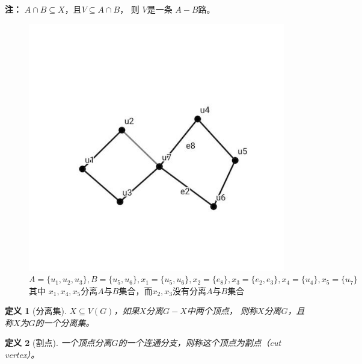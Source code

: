 \documentclass[UTF8]{ctexart}
\newtheorem{mydef}{定义}
\begin{document}
    \textbf{注：}
    $A \cap B \subseteq  X$，且$ V \subseteq A \cap B  $，
    则 $V$是一条 $A-B$路。
    
    
     \begin{figure}[ht]
        \centering
        \includegraphics[scale=0.3]{tu1.png}
        \caption{$A= \lbrace u_{1},u_{2},u_{3} \rbrace, B= \lbrace u_{5},u_{6}\rbrace ,x_{1}= \lbrace u_{5},u_{6} \rbrace , x_{2} = \lbrace e_{8} \rbrace ,x_{3}= \lbrace e_{2}, e_{3} \rbrace, x_{4}= \lbrace u_{4} \rbrace , x_{5}= \lbrace u_{7} \rbrace $ 其中 $x_{1},x_{4},x_{5}$分离$A$与$B$集合，而$x_{2},x_{3}$没有分离$A$与$B$集合}
        \label{fig:tu1}
    \end{figure}
    
    
    \begin {mydef}[分离集]
    
    $X \subseteq V(G)$，如果$X$分离$G-X$中两个顶点，
    则称$X$分离$G$，且称$X$为$G$的一个分离集。
    
    \end{mydef}
    
    
    \begin{mydef}[割点]
    
    一个顶点分离$G$的一个连通分支，则称这个顶点为割点（cut vertex）。
   
    \end{mydef}
    
\end{document}
